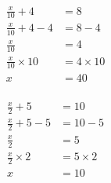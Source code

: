 \documentclass[12pt]{article}
\newcounter{minipagecount}
\begin{document}
\begin{multicols}{2}
\begin{minipage}[t]{0.45\textwidth} %
    \vspace{-26pt}  %
    \raggedright %
    \begin{align*} %
        \frac{x}{10} + 4 &= 8\\
        \frac{x}{10} + 4 - 4 &= 8 - 4\\
        \frac{x}{10} &= 4\\
        \frac{x}{10} \times10 &= 4 \times10\\
        x &= 40\\
    \end{align*}
\end{minipage} %
\noindent{(\theminipagecount)}\hspace{0.1mm} %
\begin{minipage}[t]{0.45\textwidth} %
    \vspace{-26pt}  %
    \raggedright %
    \begin{align*} %
        \frac{x}{2} + 5 &= 10\\
        \frac{x}{2} + 5 - 5 &= 10 - 5\\
        \frac{x}{2} &= 5\\
        \frac{x}{2} \times2 &= 5 \times2\\
        x &= 10\\
    \end{align*}
\end{minipage}\columnbreak

\end{multicols}
\end{document}
